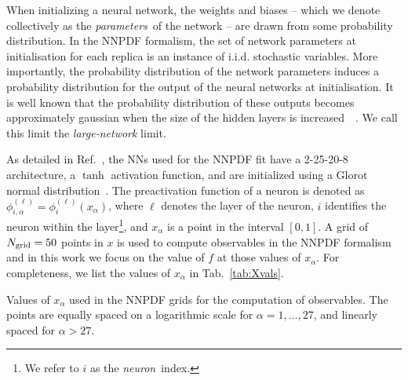 When initializing a neural network, the weights and biases -- which we denote
collectively as the {\em parameters}\ of the network -- are drawn from some
probability distribution. In the NNPDF formalism, the set of network parameters
at initialisation for each replica is an instance of i.i.d. stochastic
variables. More importantly, the probability distribution of the network
parameters induces a probability distribution for the output of the neural
networks at initialisation. It is well known that the probability distribution
of these outputs becomes approximately gaussian when the size of the hidden
layers is increased~~\cite{Roberts:2021fes}. We call this limit the {\em large-network} limit.

As detailed in Ref.~\cite{NNPDF:2021njg}, the NNs used for the NNPDF fit have a
2-25-20-8 architecture, a $\tanh$ activation function, and are initialized using
a Glorot normal distribution~\cite{glorot2010understanding}. The preactivation
function of a neuron is denoted as $\phi^{(\ell)}_{i,\alpha} =
\phi^{(\ell)}_i(x_\alpha)$, where $\ell$ denotes the layer of the neuron, $i$
identifies the neuron within the layer\footnote{We refer to $i$ as the {\em
neuron}\ index.}, and $x_{\alpha}$ is a point in the interval $[0,1]$. A grid of
$N_{\mathrm{grid}}=50$ points in $x$ is used to compute observables in the NNPDF formalism and in
this work we focus on the value of $f$ at those values of $x_\alpha$. For
completeness, we list the values of $x_\alpha$ in Tab.~\ref{tab:Xvals}.

\begin{table}[ht]
    \centering
    
    \caption{Values of $x_\alpha$ used in the NNPDF grids for the computation of
    observables. The points are equally spaced on a logarithmic scale
    for $\alpha = 1, \ldots, 27$, and linearly spaced for $\alpha > 27$.
    \label{tab:Xvals}}
\end{table}

